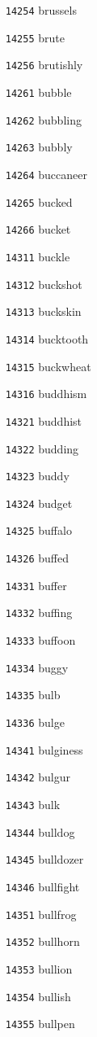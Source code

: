 \documentclass[twoside,11pt]{article}
\begin{document}
\begin{multicols}{5}
\begin{enumerate}
\item[\texttt{14254}] brussels
\item[\texttt{14255}] brute
\item[\texttt{14256}] brutishly
\item[\texttt{14261}] bubble
\item[\texttt{14262}] bubbling
\item[\texttt{14263}] bubbly
\item[\texttt{14264}] buccaneer
\item[\texttt{14265}] bucked
\item[\texttt{14266}] bucket
\item[\texttt{14311}] buckle
\item[\texttt{14312}] buckshot
\item[\texttt{14313}] buckskin
\item[\texttt{14314}] bucktooth
\item[\texttt{14315}] buckwheat
\item[\texttt{14316}] buddhism
\item[\texttt{14321}] buddhist
\item[\texttt{14322}] budding
\item[\texttt{14323}] buddy
\item[\texttt{14324}] budget
\item[\texttt{14325}] buffalo
\item[\texttt{14326}] buffed
\item[\texttt{14331}] buffer
\item[\texttt{14332}] buffing
\item[\texttt{14333}] buffoon
\item[\texttt{14334}] buggy
\item[\texttt{14335}] bulb
\item[\texttt{14336}] bulge
\item[\texttt{14341}] bulginess
\item[\texttt{14342}] bulgur
\item[\texttt{14343}] bulk
\item[\texttt{14344}] bulldog
\item[\texttt{14345}] bulldozer
\item[\texttt{14346}] bullfight
\item[\texttt{14351}] bullfrog
\item[\texttt{14352}] bullhorn
\item[\texttt{14353}] bullion
\item[\texttt{14354}] bullish
\item[\texttt{14355}] bullpen

\end{enumerate}
\end{multicols}
\end{document}
